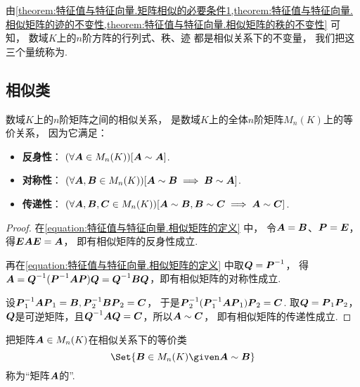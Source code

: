 \begin{remark}
由\cref{theorem:特征值与特征向量.矩阵相似的必要条件1,theorem:特征值与特征向量.相似矩阵的迹的不变性,theorem:特征值与特征向量.相似矩阵的秩的不变性} 可知，
数域\(K\)上的\(n\)阶方阵的行列式、秩、迹
都是相似关系下的不变量，
我们把这三个量统称为.
\end{remark}

\subsection{相似类}
\begin{property}\label{theorem:特征值与特征向量.相似关系是等价关系}
数域\(K\)上的\(n\)阶矩阵之间的相似关系，
是数域\(K\)上的全体\(n\)阶矩阵\(M_n(K)\)上的等价关系，
因为它满足：\begin{itemize}
	\item {\rm\bf 反身性}：
	\((\forall \boldsymbol{A} \in M_n(K))
	[\boldsymbol{A}\sim\boldsymbol{A}]\).

	\item {\rm\bf 对称性}：
	\((\forall \boldsymbol{A},\boldsymbol{B} \in M_n(K))
	[\boldsymbol{A} \sim \boldsymbol{B} \implies \boldsymbol{B} \sim \boldsymbol{A}]\).

	\item {\rm\bf 传递性}：
	\((\forall \boldsymbol{A},\boldsymbol{B},\boldsymbol{C} \in M_n(K))
	[\boldsymbol{A} \sim \boldsymbol{B}, \boldsymbol{B} \sim \boldsymbol{C} \implies \boldsymbol{A} \sim \boldsymbol{C}]\).
\end{itemize}
\begin{proof}
在\cref{equation:特征值与特征向量.相似矩阵的定义} 中，
令\(\boldsymbol{A}=\boldsymbol{B}\)、\(\boldsymbol{P}=\boldsymbol{E}\)，得\(\boldsymbol{E}\boldsymbol{A}\boldsymbol{E}=\boldsymbol{A}\)，
即有相似矩阵的反身性成立.

再在\cref{equation:特征值与特征向量.相似矩阵的定义} 中取\(\boldsymbol{Q}=\boldsymbol{P}^{-1}\)，
得\(\boldsymbol{A} = \boldsymbol{Q}^{-1}(\boldsymbol{P}^{-1}\boldsymbol{A}\boldsymbol{P})\boldsymbol{Q} = \boldsymbol{Q}^{-1}\boldsymbol{B}\boldsymbol{Q}\)，即有相似矩阵的对称性成立.

设\(\boldsymbol{P}_1^{-1}\boldsymbol{A}\boldsymbol{P}_1=\boldsymbol{B},
\boldsymbol{P}_2^{-1}\boldsymbol{B}\boldsymbol{P}_2=\boldsymbol{C}\)，
于是\(\boldsymbol{P}_2^{-1}(\boldsymbol{P}_1^{-1}\boldsymbol{A}\boldsymbol{P}_1)\boldsymbol{P}_2=\boldsymbol{C}\).
取\(\boldsymbol{Q}=\boldsymbol{P}_1\boldsymbol{P}_2\)，\(\boldsymbol{Q}\)是可逆矩阵，且\(\boldsymbol{Q}^{-1}\boldsymbol{A}\boldsymbol{Q}=\boldsymbol{C}\)，所以\(\boldsymbol{A}\sim\boldsymbol{C}\)，
即有相似矩阵的传递性成立.
\end{proof}
\end{property}

\begin{definition}
把矩阵\(\boldsymbol{A} \in M_n(K)\)在相似关系下的等价类\begin{equation*}
	\Set{ \vb{B} \in M_n(K) \given \vb{A}\sim\vb{B} }
\end{equation*}称为“矩阵\(\boldsymbol{A}\)的”.
\end{definition}

